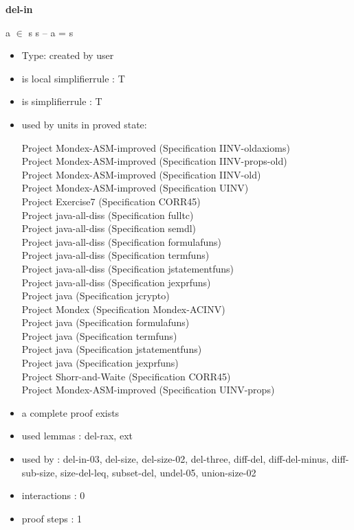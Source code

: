 \documentclass[a4paper]{article}
\begin{document}
{\LARGE\bf del-in}\label{lemma-del-in}

\medskip

 \Fol \Not a $\in$ s \Imp s -- a = s

\begin{itemize}

\item Type: created by user

\item is local simplifierrule : T
\item is simplifierrule : T
\item used by units in proved state:

Project Mondex-ASM-improved (Specification IINV-oldaxioms) \\
Project Mondex-ASM-improved (Specification IINV-props-old) \\
Project Mondex-ASM-improved (Specification IINV-old) \\
Project Mondex-ASM-improved (Specification UINV) \\
Project Exercise7 (Specification CORR45) \\
Project java-all-diss (Specification fulltc) \\
Project java-all-diss (Specification semdl) \\
Project java-all-diss (Specification formulafuns) \\
Project java-all-diss (Specification termfuns) \\
Project java-all-diss (Specification jstatementfuns) \\
Project java-all-diss (Specification jexprfuns) \\
Project java (Specification jcrypto) \\
Project Mondex (Specification Mondex-ACINV) \\
Project java (Specification formulafuns) \\
Project java (Specification termfuns) \\
Project java (Specification jstatementfuns) \\
Project java (Specification jexprfuns) \\
Project Shorr-and-Waite (Specification CORR45) \\
Project Mondex-ASM-improved (Specification UINV-props)
\item       a complete proof exists
\item       used lemmas  : del-rax, ext
\item       used by      : del-in-03, del-size, del-size-02, del-three, diff-del, diff-del-minus, diff-sub-size, size-del-leq, subset-del, undel-05, union-size-02
\item       interactions : 0
\item       proof steps  : 1
\end{itemize}
\end{document}
